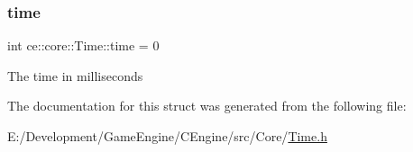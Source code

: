 \subsubsection{\texorpdfstring{time}{time}}
{\footnotesize\ttfamily int ce\+::core\+::\+Time\+::time = 0}

The time in milliseconds 

The documentation for this struct was generated from the following file\+:\begin{DoxyCompactItemize}
\item 
E\+:/\+Development/\+Game\+Engine/\+C\+Engine/src/\+Core/\hyperlink{_time_8h}{Time.\+h}\end{DoxyCompactItemize}

